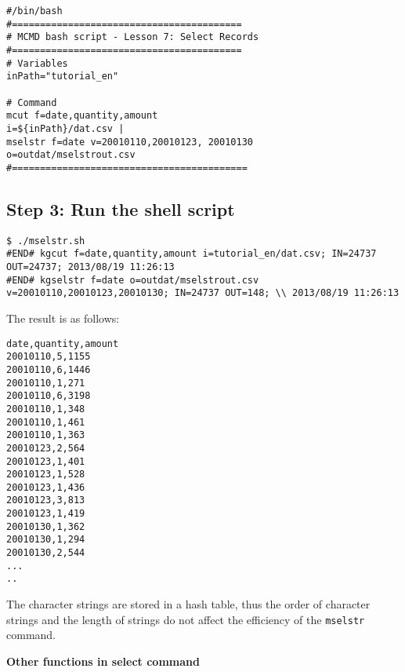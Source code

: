 \begin{verbatim}
#/bin/bash
#=========================================
# MCMD bash script - Lesson 7: Select Records 
#=========================================
# Variables
inPath="tutorial_en"

# Command 
mcut f=date,quantity,amount                      					i=${inPath}/dat.csv |
mselstr f=date v=20010110,20010123, 20010130  			o=outdat/mselstrout.csv
#==========================================
\end{verbatim}

\subsection{Step 3: Run the shell script }

\begin{verbatim}
$ ./mselstr.sh 
#END# kgcut f=date,quantity,amount i=tutorial_en/dat.csv; IN=24737 OUT=24737; 2013/08/19 11:26:13
#END# kgselstr f=date o=outdat/mselstrout.csv v=20010110,20010123,20010130; IN=24737 OUT=148; \\ 2013/08/19 11:26:13
\end{verbatim}

\noindent
The result is as follows: 

\begin{verbatim}
date,quantity,amount
20010110,5,1155
20010110,6,1446
20010110,1,271
20010110,6,3198
20010110,1,348
20010110,1,461
20010110,1,363
20010123,2,564
20010123,1,401
20010123,1,528
20010123,1,436
20010123,3,813
20010123,1,419
20010130,1,362
20010130,1,294
20010130,2,544
...
..
\end{verbatim}

The character strings are stored in a hash table, thus the order of character strings and the length of strings do not affect the efficiency of the \verb|mselstr| command. \\

{\setlength{\parindent}{0cm}
\textbf{Other functions in select command  }\\


}


